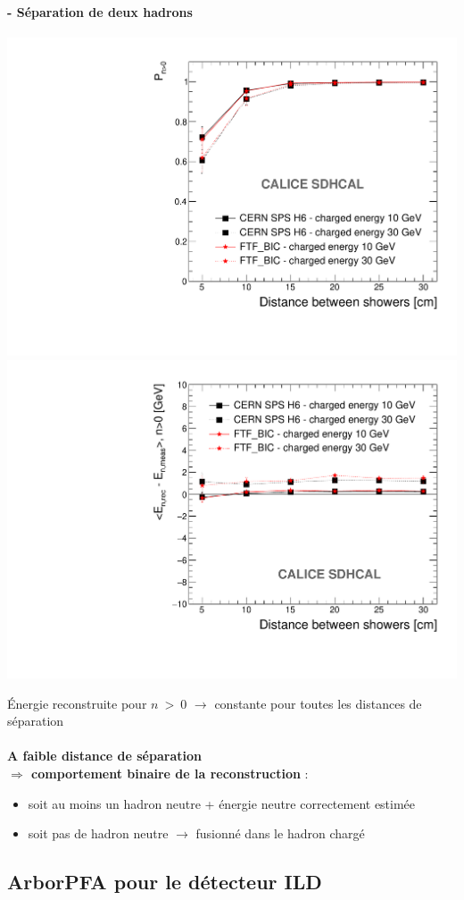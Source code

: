 \documentclass[8pt]{beamer}
\begin{document}
  \begin{frame}
  \frametitle{\secname}
  \framesubtitle{\subsecname - Séparation de deux hadrons}
    \begin{center}
      \includegraphics[width=0.49\linewidth]{OverlayEvent_ProbaNeutral.pdf}
      \includegraphics[width=0.49\linewidth]{OverlayEvent_EnergyDifferenceEfficient.pdf}
    \end{center}
    Énergie reconstruite pour $n~>~0$ $\rightarrow$ constante pour toutes les distances de séparation \\
    ~ \\
    \textbf{A faible distance de séparation \\ $\Rightarrow$ comportement binaire de la reconstruction} :
    \begin{itemize}
      \item soit au moins un hadron neutre + énergie neutre correctement estimée
      \item soit pas de hadron neutre $\rightarrow$ fusionné dans le hadron chargé
    \end{itemize}
  \end{frame}



  \subsection{ArborPFA pour le détecteur ILD}
\end{document}
